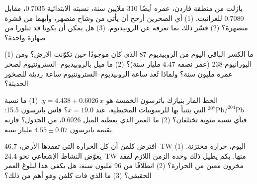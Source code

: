 \begin{exercise}[$\star\star\star$]\label{exo:g12:age-of-the-earth:12}
بازلت من منطقة فاردن، عمره أيضًا 310 ملايين سنة، نسبته
الابتدائية 0.7035، مقابل 0.7080 للغرانيت. (1) أي الصخرين أرجح
أن يأتي من وشاح منصهر، وأيهما من قشرة منصهرة؟ (2) فسّر
ذلك بما تعرفه عن الروبيديوم. (3) هل يمكن أن يكونا قد تبلورا من
صهارة واحدة؟
\end{exercise}

\begin{exercise}[$\star\star\star$]\label{exo:g12:age-of-the-earth:13}
(1) ما الكسر الباقي اليوم من الروبيديوم-87 الذي كان موجودًا حين تكوّنت
الأرض؟ ومن اليورانيوم-238 (عمر نصفه 4.47 مليار سنة)؟ (2) ما
ميل  بالروبيديوم--السترونتيوم لصخر عمره مليون
سنة؟ ولماذا تُعد ساعة الروبيديوم--السترونتيوم ساعة رديئة للصخور الحديثة؟
\end{exercise}

\begin{exercise}[$\star\star\star$]\label{exo:g12:age-of-the-earth:14}
الخط المار بنيازك باترسون الخمسة هو $y = 4.438 + 0.6026\,x$.
(1) ما نسبة $^{207}\mathrm{Pb}/^{204}\mathrm{Pb}$ التي يتنبأ بها للرسوبيات
المحيطية، عند $x = 19.0$؟ قاس باترسون 15.5: فبأي نسبة مئوية
تختلفان؟ (2) ما العمر الذي يعطيه الميل 0.6026، من الجدول؟ قارنه بقيمة
باترسون $4.55 \pm 0.07$ مليار سنة.
\end{exercise}

\begin{exercise}[$\star\star\star$]\label{exo:g12:age-of-the-earth:15}
افترض كلفن أن كل الحرارة التي تفقدها الأرض، \qty{46.7}{TW} اليوم، حرارة
مختزنة. (1) يعوّض النشاط الإشعاعي نحو \qty{24.4}{TW} منها. بكم
يطيل ذلك وحده الزمن اللازم لفقد مخزون معين من الحرارة؟
(2) انطلاقًا من 96 مليون سنة، هل يكفي هذا لبلوغ العمر الحقيقي؟
(3) ما الذي فات كلفن وهو أهم من ذلك؟
\end{exercise}

